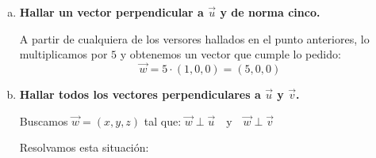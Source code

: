 \documentclass[11pt,a4paper]{article}
\begin{document}
\begin{enumerate}[\hspace{-5mm} 1) ]
\begin{enumerate}[a)]
\begin{itemize}
    \item Tomamos por ejemplo $x = 0, \ z = 1$, entonces tenemos:
    \begin{align*}
        \vec{w}  
        &= 
        \frac{1}{\,\sqrt{0^2+2\cdot 1^2\,}\,} (0,-1,1)
        \\
        &= \frac{1}{\,\sqrt{2\,}\,} (0,-1,1)
        \\
        &= (0,-\tfrac{1}{\,\sqrt{2\,}\,},\tfrac{1}{\,\sqrt{2\,}\,})
    \end{align*}
    

    \item Tomamos por ejemplo $x = 1, \ z = 1$, entonces tenemos:
    \begin{align*}
        \vec{w}  
        &= 
        \frac{1}{\,\sqrt{1^2+2\cdot 1^2\,}\,} (1,-1,1)
        \\
        &= \frac{1}{\,\sqrt{3\,}\,} (0,-1,1)
        \\
        &= (\tfrac{1}{\,\sqrt{3\,} \,},-\tfrac{1}{\,\sqrt{3\,}\,},\tfrac{1}{\,\sqrt{3\,}\,} )
    \end{align*}
\end{itemize}
      
    No existe un único vector que cumpla con lo solicitado, ya que, como vimos, hay infinitos vectores unitarios ortogonales a $\vec{u}$. Basta con elegir cualquier par de valores $x$ y $z$ que no sean simultáneamente nulos, y al normalizar el vector resultante se obtiene una nueva opción para $\vec{w}$. En nuestro ejemplo mostramos tres posibilidades distintas para $\vec{w}$, todas ellas válidas y hay más opciones.

    \item \textbf{Hallar un vector perpendicular a $\vec{u}$ y de norma cinco.}

    A partir de cualquiera de los versores hallados en el punto anteriores, lo multiplicamos por $5$ y obtenemos un vector que cumple lo pedido:
    \[
    \vec{w} = 5 \cdot \left( 1, 0, 0 \right) = \left( 5,0,0 \right)
    \]

    \item \textbf{Hallar todos los vectores perpendiculares a $\vec{u}$ y $\vec{v}$.}

    Buscamos $\vec{w} = (x, y, z)$ tal que: $ \vec{w} \perp \vec{u}  \quad \text{y} \quad \vec{w} \perp \vec{v}$

\noindent Resolvamos esta situación:

\bigskip 


\begin{itemize} 


\end{itemize}
\end{enumerate}
\end{enumerate}
\end{document}
